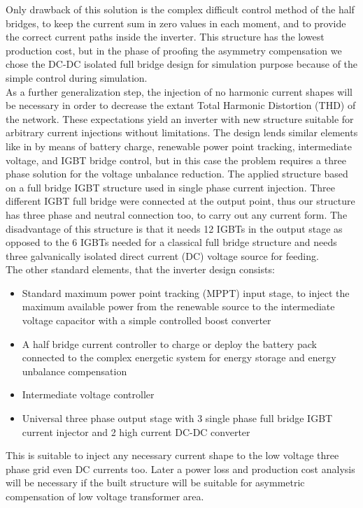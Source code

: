     Only drawback of this solution is the complex difficult control method of the half bridges, to keep the current sum in zero values in each moment, and to provide the correct current paths inside the inverter. This structure has the lowest production cost, but in the phase of proofing the asymmetry compensation we chose the DC-DC isolated  full bridge design for simulation purpose because of the simple control during simulation.\\
    As a further generalization step, the injection of no harmonic current shapes will be necessary in order to decrease the extant Total Harmonic Distortion (THD) of the network. These expectations yield an inverter with new structure suitable for arbitrary current injections without limitations. The design lends similar elements like in \cite{gorbe2012reduction} by means of battery charge, renewable power point tracking, intermediate voltage, and IGBT bridge control, but in this case the problem requires a three phase solution for the voltage unbalance reduction. The applied structure based on a full bridge IGBT structure used in single phase current injection. Three different IGBT full bridge were connected at the output point, thus our structure has three phase and neutral connection too, to carry out any current form. The disadvantage of this structure is that it needs 12 IGBTs in the output stage as opposed to the 6 IGBTs needed for a classical full bridge structure and needs three galvanically isolated direct current (DC) voltage source for feeding.\\
    The other standard elements, that the inverter design consists:

        \begin{itemize}
            \item Standard maximum power point tracking (MPPT) input stage, to inject the maximum available power from the renewable source to the intermediate voltage capacitor with a simple controlled boost converter
            \item A half bridge current controller to charge or deploy the battery pack connected to the complex energetic system for energy storage and energy unbalance compensation
            \item Intermediate voltage controller
            \item Universal three phase output stage with 3 single phase full bridge IGBT current injector and 2 high current DC-DC converter
        \end{itemize}
    This is suitable to inject any necessary current shape to the low voltage three phase grid even DC currents too. Later a power loss and production cost analysis will be necessary if the built structure will be suitable for asymmetric compensation of low voltage transformer area.

